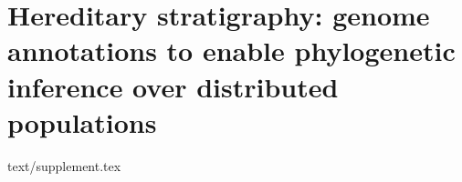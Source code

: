 \chapter{Hereditary stratigraphy: genome annotations to enable phylogenetic inference over distributed populations}
\label{ch:distributed-phylogeny-appendix}

{text/supplement.tex}
